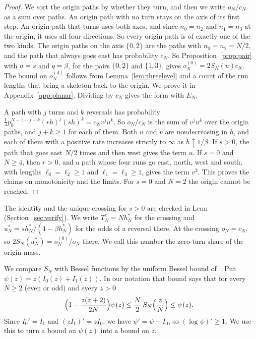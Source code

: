 \begin{proof}
We sort the origin paths by whether they turn, and then we write $o_N/c_N$ as a sum over paths.
An origin path with no turn stays on the axis of its first step. An origin path that turns uses both
axes, and since $n_0=n_2$ and $n_1=n_3$ at the origin, it uses all four directions. So every origin
path is of exactly one of the two kinds. The origin paths on the axis $\{0,2\}$ are the paths with
$n_0=n_2=N/2$, and the path that always goes east has probability $c_N$. So
Proposition~\ref{prop:pair} with $a=s$ and $q=\beta$, for the pairs $\{0,2\}$ and $\{1,3\}$, gives
$o^{(0)}_N=2S_N(u)c_N$. The bound on $o^{(4)}_N$ follows from Lemma~\ref{lem:threelevel} and a count
of the run lengths that bring a skeleton back to the origin. We prove it in
Appendix~\ref{app:planar}. Dividing by $c_N$ gives the form with $E_N$.

A path with $j$ turns and $k$ reversals has probability $\frac14p_0^{N-1-j-k}(rh)^j(sh)^k=c_Nv^ju^k$.
So $o_N/c_N$ is the sum of $v^ju^k$ over the origin paths, and $j+k\ge1$ for each of them. Both $u$
and $v$ are nondecreasing in $h$, and each of them with a positive rate increases strictly to
$\infty$ as $h\uparrow1/\beta$. If $s>0$, the path that goes east $N/2$ times and then west gives
the term $u$. If $s=0$ and $N\ge4$, then $r>0$, and a path whose four runs go east, north, west and
south, with lengths $\ell_0=\ell_2\ge1$ and $\ell_1=\ell_3\ge1$, gives the term $v^3$. This proves
the claims on monotonicity and the limits. For $s=0$ and $N=2$ the origin cannot be reached.
\end{proof}

The identity and the unique crossing for $s>0$ are checked in Lean (Section~\ref{sec:verify}). We
write $T^*_N=Nh^*_N$ for the crossing and $u^*_N=sh^*_N/(1-\beta h^*_N)$ for the odds of a reversal
there. At the crossing $o_N=c_N$, so $2S_N(u^*_N)=o^{(0)}_N/o_N$ there. We call this number the
zero-turn share of the origin mass.

We compare $S_N$ with Bessel functions by the uniform Bessel bound
of~\cite[Theorem~3.3(i)]{paperA}. Put $\psi(z)=z(I_0(z)+I_1(z))$. In our notation that bound says
that for every $N\ge2$ (even or odd) and every $z>0$
\begin{equation}\label{eq:planar-bessel}
 \Bigl(1-\frac{z(z+2)}{2N}\Bigr)\psi(z)\le\frac N2\,S_N\Bigl(\frac zN\Bigr)\le\psi(z).
\end{equation}
Since $I_0'=I_1$ and $(zI_1)'=zI_0$, we have $\psi'=\psi+I_0$, so $(\log\psi)'\ge1$. We use this
to turn a bound on $\psi(z)$ into a bound on $z$.

